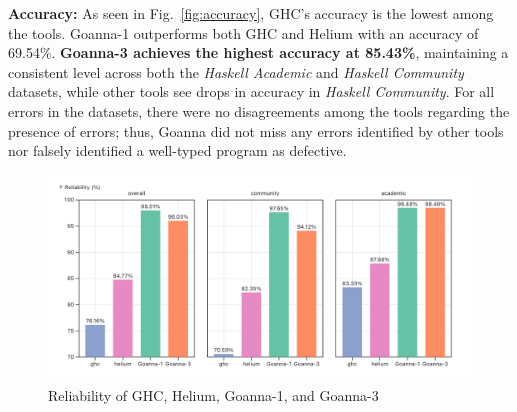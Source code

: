 \documentclass[pdflatex,lineno,sn-nature,Numbered]{sn-jnl}%
\begin{document}
\textbf{Accuracy:} As seen in Fig.~\ref{fig:accuracy}, GHC's accuracy is the lowest among the tools. Goanna-1 outperforms both GHC and Helium with an accuracy of 69.54\%. \textbf{Goanna-3 achieves the highest accuracy at 85.43\%}, maintaining a consistent level across both the \textit{Haskell Academic} and \textit{Haskell Community} datasets, while other tools see drops in accuracy in \textit{Haskell Community}. For all errors in the datasets, there were no disagreements among the tools regarding the presence of errors; thus, Goanna did not miss any errors identified by other tools nor falsely identified a well-typed program as defective.

    \begin{figure}
        \centering
        \includegraphics[width=\linewidth]{images/Reliability.png}
        \caption{Reliability of GHC, Helium, Goanna-1, and Goanna-3}
        \label{fig:reliability}
    \end{figure}
\end{document}
